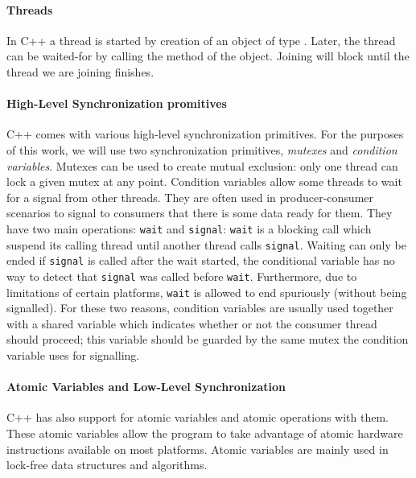 \paragraph{Threads}
%
In C++ a thread is started by creation of an object of type
.
Later, the thread can be waited-for by calling the  method of the
 object.
Joining will block until the thread we are joining finishes.

\paragraph{High-Level Synchronization promitives}

C++ comes with various high-level synchronization primitives.
For the purposes of this work, we will use two synchronization primitives,
\emph{mutexes} and \emph{condition variables}.
Mutexes can be used to create mutual exclusion: only one thread can lock a
given mutex at any point.
Condition variables allow some threads to wait for a signal from other threads.
They are often used in producer-consumer scenarios to signal to consumers that
there is some data ready for them.
They have two main operations: \texttt{wait} and \texttt{signal}: \texttt{wait}
is a blocking call which suspend its calling thread until another thread calls
\texttt{signal}.
Waiting can only be ended if \texttt{signal} is called after the wait started,
the conditional variable has no way to detect that \texttt{signal} was called
before \texttt{wait}.
Furthermore, due to limitations of certain platforms, \texttt{wait} is allowed
to end spuriously (without being signalled).
For these two reasons, condition variables are usually used together with a
shared variable which indicates whether or not the consumer thread should
proceed; this variable should be guarded by the same mutex the condition
variable uses for signalling.

\paragraph{Atomic Variables and Low-Level Synchronization}
%
C++ has also support for atomic variables and atomic operations with them.
These atomic variables allow the program to take advantage of atomic hardware
instructions available on most platforms.
Atomic variables are mainly used in lock-free data structures and algorithms.

